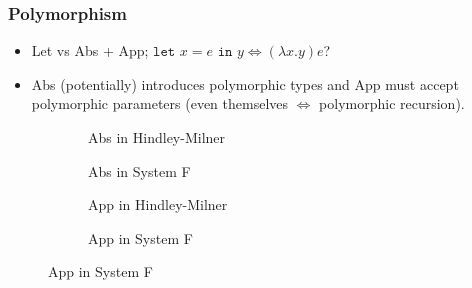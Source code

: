 \documentclass{beamer}
\begin{document}
\begin{frame}
\frametitle{Polymorphism}
\begin{itemize}
    \item Let vs Abs + App; $\texttt{let } x = e \texttt{ in } y \Leftrightarrow (\lambda x. y) e$?
    \item Abs (potentially) introduces polymorphic types and App must accept polymorphic parameters (even themselves $\Leftrightarrow$ polymorphic recursion).
\end{itemize}
\begin{figure}
    \centering
    \begin{subfigure}[b]{0.4\textwidth}
    \centering
    \begin{prooftree}
    \end{prooftree}
    \caption{Abs in Hindley-Milner}
    \end{subfigure}
    \begin{subfigure}[b]{0.4\textwidth}
    \centering
    \begin{prooftree}
    \end{prooftree}
    \caption{Abs in System F~\cite{WELLS1999111}}
    \end{subfigure}

    \begin{subfigure}[b]{1\textwidth}
    \centering
    \begin{prooftree}
    \end{prooftree}
    \caption{App in Hindley-Milner}
    \end{subfigure}
    \begin{subfigure}[b]{1\textwidth}
    \centering
    \begin{prooftree}
    \end{prooftree}
    \caption{App in System F~\cite{WELLS1999111}}
    \end{subfigure}
\end{figure}
\end{frame}
\end{document}
